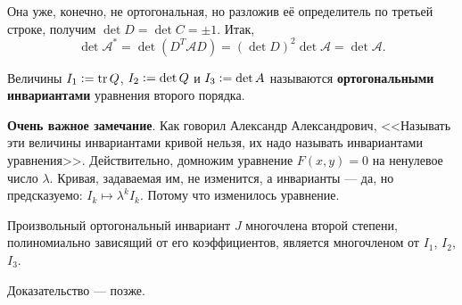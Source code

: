 Она уже, конечно, не ортогональная, но разложив её определитель по третьей строке, получим $\det D = \det C = \pm 1$. Итак,
$$
\det \mathcal{A}^\ast = \det(D^T\mathcal{A}D) = (\det D)^2 \det \mathcal{A} = \det \mathcal{A}.
$$

\begin{definition}
    Величины $I_1 \vcentcolon = \mathrm{tr}\, Q$, $I_2 \vcentcolon = \det Q$ и $I_3 \vcentcolon = \det A$ называются \textbf{ортогональными инвариантами} уравнения второго порядка.
\end{definition}

\begin{orangebox}
    \textbf{Очень важное замечание}. Как говорил Александр Александрович, <<Называть эти величины инвариантами кривой нельзя, их надо называть инвариантами уравнения>>. Действительно, домножим уравнение $F(x, y) = 0$ на ненулевое число $\lambda$. Кривая, задаваемая им, не изменится, а инварианты --- да, но предсказуемо: $I_k \mapsto \lambda^k I_k$. Потому что изменилось уравнение.
\end{orangebox}

\begin{theorem}
    Произвольный ортогональный инвариант $J$ многочлена второй степени, полиномиально зависящий от его коэффициентов, является многочленом от $I_1$, $I_2$, $I_3$.
\end{theorem}

Доказательство --- позже.

